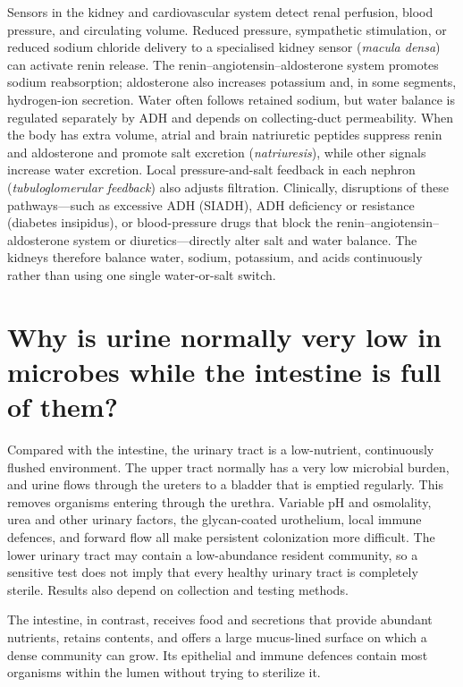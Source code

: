 \documentclass[11pt,oneside]{report}
\begin{document}
Sensors in the kidney and cardiovascular system detect renal perfusion, blood
pressure, and circulating volume. Reduced pressure, sympathetic stimulation,
or reduced sodium chloride delivery to a specialised kidney sensor
(\emph{macula densa}) can activate renin release. The
renin--angiotensin--aldosterone system promotes sodium reabsorption; aldosterone
also increases potassium and, in some segments, hydrogen-ion secretion. Water
often follows retained sodium, but water balance is regulated separately by ADH
and depends on collecting-duct permeability. When the body has extra volume,
atrial and brain natriuretic peptides suppress renin and aldosterone and promote
salt excretion (\emph{natriuresis}), while other signals increase water
excretion. Local pressure-and-salt feedback in each nephron
(\emph{tubuloglomerular feedback}) also adjusts filtration. Clinically,
disruptions of these pathways—such as excessive ADH (SIADH), ADH deficiency or
resistance (diabetes insipidus), or blood-pressure drugs that block the
renin--angiotensin--aldosterone system or diuretics—directly alter salt and
water balance. The
kidneys therefore balance water, sodium, potassium, and acids continuously
rather than using one single water-or-salt switch.

\section{Why is urine normally very low in microbes while the intestine is full of them?}

Compared with the intestine, the urinary tract is a low-nutrient, continuously
flushed environment. The upper tract normally has a very low microbial burden,
and urine flows through the ureters to a bladder that is emptied regularly.
This removes organisms entering through the urethra. Variable pH and
osmolality, urea and other urinary factors, the glycan-coated urothelium,
local immune defences, and forward flow all make persistent colonization more
difficult. The lower urinary tract may contain a low-abundance resident
community, so a sensitive test does not imply that every healthy urinary tract
is completely sterile. Results also depend on collection and testing methods.

The intestine, in contrast, receives food and secretions that provide abundant
nutrients, retains contents, and offers a large mucus-lined surface on which a
dense community can grow. Its epithelial and immune defences contain most
organisms within the lumen without trying to sterilize it.
\end{document}

